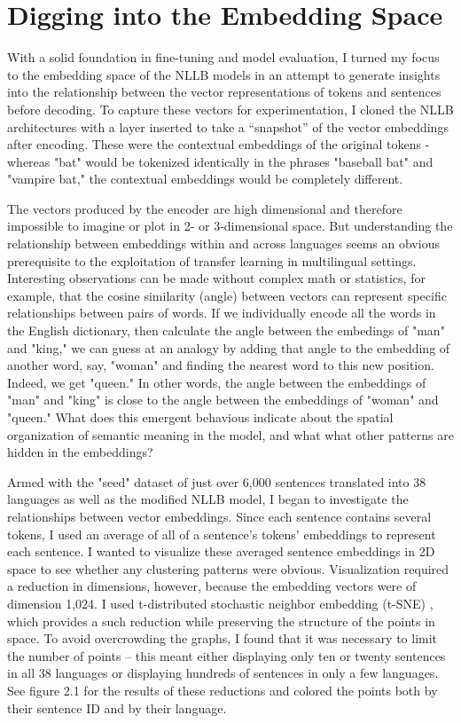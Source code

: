 \section{Digging into the Embedding Space}

With a solid foundation in fine-tuning and model evaluation, I turned my focus to the embedding space of the NLLB models in an attempt to generate insights into the relationship between the vector representations of tokens and sentences before decoding. To capture these vectors for experimentation, I cloned the NLLB architectures with a layer inserted to take a “snapshot” of the vector embeddings after encoding. These were the contextual embeddings of the original tokens - whereas "bat" would be tokenized identically in the phrases "baseball bat" and "vampire bat," the contextual embeddings would be completely different.

The vectors produced by the encoder are high dimensional and therefore impossible to imagine or plot in 2- or 3-dimensional space. But understanding the relationship between embeddings within and across languages seems an obvious prerequisite to the exploitation of transfer learning in multilingual settings. Interesting observations can be made without complex math or statistics, for example, that the cosine similarity (angle) between vectors can represent specific relationships between pairs of words. If we individually encode all the words in the English dictionary, then calculate the angle between the embedings of "man" and "king," we can guess at an analogy by adding that angle to the embedding of another word, say, "woman" and finding the nearest word to this new position. Indeed, we get "queen." In other words, the angle between the embeddings of "man" and "king" is close to the angle between the embeddings of "woman" and "queen." What does this emergent behavious indicate about the spatial organization of semantic meaning in the model, and what what other patterns are hidden in the embeddings?

Armed with the "seed" dataset of just over 6,000 sentences translated into 38 languages as well as the modified NLLB model, I began to investigate the relationships between vector embeddings. Since each sentence contains several tokens, I used an average of all of a sentence's tokens' embeddings to represent each sentence. I wanted to visualize these averaged sentence embeddings in 2D space to see whether any clustering patterns were obvious. Visualization required a reduction in dimensions, however, because the embedding vectors were of dimension 1,024. I used t-distributed stochastic neighbor embedding (t-SNE) \cite{van2008visualizing}, which provides a such reduction while preserving the structure of the points in space. To avoid overcrowding the graphs, I found that it was necessary to limit the number of points -- this meant either displaying only ten or twenty sentences in all 38 languages or displaying hundreds of sentences in only a few languages. See figure 2.1 for the results of these reductions and colored the points both by their sentence ID and by their language. 

